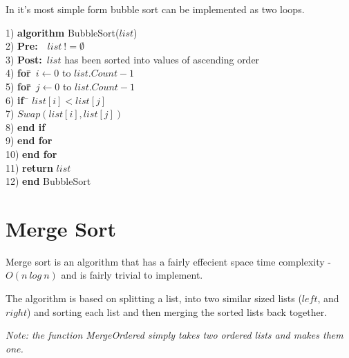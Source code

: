 \documentclass[10pt,oneside,a4paper]{report}
\begin{document}
In it's most simple form bubble sort can be implemented as two loops.

\begin{tabbing}
1)  \textbf{alg}\= \textbf{orithm} BubbleSort($list$) \\
2)  \> \textbf{Pre:}~~$list~!= \emptyset$ \\
3)  \> \textbf{Post:}~$list$ has been sorted into values of ascending order \\
4)  \> \textbf{for}\=~$i \leftarrow 0$ to $list.Count - 1$ \\
5)  \> \> \textbf{for}\=~$j \leftarrow 0$ to $list.Count - 1$ \\
6)  \> \> \> \textbf{if}~\= $list[i] < list[j]$ \\
7)  \> \> \> \> $Swap(list[i], list[j])$ \\
8)  \> \> \> \textbf{end if} \\
9)  \> \> \textbf{end for} \\
10) \> \textbf{end for} \\
11) \> \textbf{return} $list$ \\
12) \textbf{end} BubbleSort
\end{tabbing}

\section{Merge Sort}
Merge sort is an algorithm that has a fairly effecient space time complexity - $O(n~log~n)$ and is fairly trivial to implement.

The algorithm is based on splitting a list, into two similar sized lists ($left$, and $right$) and sorting each list and then merging the sorted lists back together.

\textit{Note: the function MergeOrdered simply takes two ordered lists and makes them one.}
\end{document}

